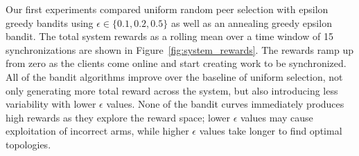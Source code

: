 Our first experiments compared uniform random peer selection with epsilon
greedy bandits using $\epsilon \in \{0.1, 0.2, 0.5\}$ as well as an annealing
greedy epsilon bandit.
The total system rewards as a rolling mean over a time window of 15
synchronizations are shown in Figure~\ref{fig:system_rewards}.
The rewards ramp up from zero as the clients come online and start
creating work to be synchronized.
All of the bandit algorithms improve over the baseline of uniform selection,
not only generating more total reward across the system, but also introducing
less variability with lower $\epsilon$ values.
None of the bandit curves immediately produces high rewards as they explore
the reward space; lower $\epsilon$ values may cause exploitation of incorrect
arms, while higher $\epsilon$ values take longer to find optimal topologies.

